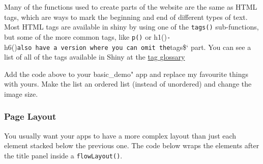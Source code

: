 \documentclass[
]{book}
\newenvironment{Shaded}{\begin{snugshade}}{\end{snugshade}}
\newcommand{\AttributeTok}[1]{\textcolor[rgb]{0.77,0.63,0.00}{#1}}
\newcommand{\FunctionTok}[1]{\textcolor[rgb]{0.00,0.00,0.00}{#1}}
\newcommand{\NormalTok}[1]{#1}
\newcommand{\OtherTok}[1]{\textcolor[rgb]{0.56,0.35,0.01}{#1}}
\newcommand{\SpecialCharTok}[1]{\textcolor[rgb]{0.00,0.00,0.00}{#1}}
\newcommand{\StringTok}[1]{\textcolor[rgb]{0.31,0.60,0.02}{#1}}
\begin{document}
Many of the functions used to create parts of the website are the same as HTML tags, which are ways to mark the beginning and end of different types of text. Most HTML tags are available in shiny by using one of the \texttt{tags()} sub-functions, but some of the more common tags, like \texttt{p()} or h1()\texttt{-}h6()\texttt{also\ have\ a\ version\ where\ you\ can\ omit\ the}tags\$` part. You can see a list of all of the tags available in Shiny at the \href{https://shiny.rstudio.com/articles/tag-glossary.html}{tag glossary}

Add the code above to your basic\_demo" app and replace my favourite things with yours. Make the list an ordered list (instead of unordered) and change the image size.

\hypertarget{page-layout}{%
\subsubsection{Page Layout}\label{page-layout}}

You usually want your apps to have a more complex layout than just each element stacked below the previous one. The code below wraps the elements after the title panel inside a \texttt{flowLayout()}.

\begin{Shaded}
\end{Shaded}
\end{document}
